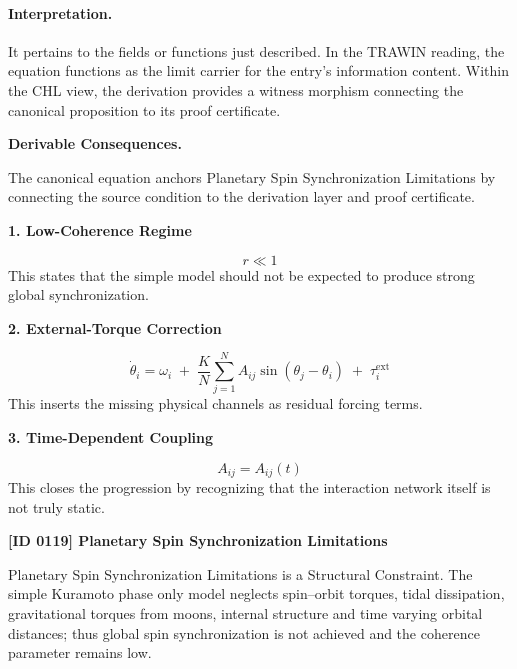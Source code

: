 \paragraph{Interpretation.}
It pertains to the fields or functions just described. In the TRAWIN reading, the equation functions as the limit carrier for the entry’s information content. Within the CHL view, the derivation provides a witness morphism connecting the canonical proposition to its proof certificate.

\par\vspace{0.35em}
\noindent\textbf{Derivable Consequences.}\quad
\begingroup
\footnotesize
\raggedright
The canonical equation anchors Planetary Spin Synchronization Limitations by connecting the source condition to the derivation layer and proof certificate.
\par\endgroup

\noindent\textbf{1. Low-Coherence Regime}\par
\[
r \ll 1
\]
\noindent This states that the simple model should not be expected to produce strong global synchronization.\par
\noindent\textbf{2. External-Torque Correction}\par
\[
\dot{\theta}_i
=
\omega_i
\;+\;
\frac{K}{N}\sum_{j=1}^{N}A_{ij}\sin(\theta_j-\theta_i)
\;+\;
\tau_i^{\mathrm{ext}}
\]
\noindent This inserts the missing physical channels as residual forcing terms.\par
\noindent\textbf{3. Time-Dependent Coupling}\par
\[
A_{ij}=A_{ij}(t)
\]
\noindent This closes the progression by recognizing that the interaction network itself is not truly static.\par

\clearpage
\noindent\textbf{[ID 0119] Planetary Spin Synchronization Limitations}\par
\vspace{0.35em}
\begingroup\small
{}
Planetary Spin Synchronization Limitations is a Structural Constraint. The simple Kuramoto phase only model neglects spin--orbit torques, tidal dissipation, gravitational torques from moons, internal structure and time varying orbital distances; thus global spin synchronization is not achieved and the coherence parameter remains low.


